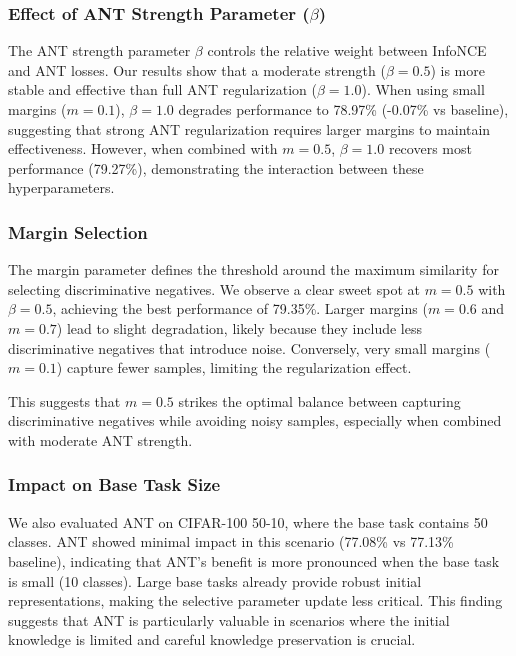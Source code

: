 \documentclass[letterpaper]{article} %
\begin{document}
\subsubsection{Effect of ANT Strength Parameter ($\beta$)}

The ANT strength parameter $\beta$ controls the relative weight between InfoNCE and ANT losses. Our results show that a moderate strength ($\beta=0.5$) is more stable and effective than full ANT regularization ($\beta=1.0$). When using small margins ($m=0.1$), $\beta=1.0$ degrades performance to 78.97\% (-0.07\% vs baseline), suggesting that strong ANT regularization requires larger margins to maintain effectiveness. However, when combined with $m=0.5$, $\beta=1.0$ recovers most performance (79.27\%), demonstrating the interaction between these hyperparameters.

\subsubsection{Margin Selection}

The margin parameter defines the threshold around the maximum similarity for selecting discriminative negatives. We observe a clear sweet spot at $m=0.5$ with $\beta=0.5$, achieving the best performance of 79.35\%. Larger margins ($m=0.6$ and $m=0.7$) lead to slight degradation, likely because they include less discriminative negatives that introduce noise. Conversely, very small margins ($m=0.1$) capture fewer samples, limiting the regularization effect.

This suggests that $m=0.5$ strikes the optimal balance between capturing discriminative negatives while avoiding noisy samples, especially when combined with moderate ANT strength.

\subsubsection{Impact on Base Task Size}

We also evaluated ANT on CIFAR-100 50-10, where the base task contains 50 classes. ANT showed minimal impact in this scenario (77.08\% vs 77.13\% baseline), indicating that ANT's benefit is more pronounced when the base task is small (10 classes). Large base tasks already provide robust initial representations, making the selective parameter update less critical. This finding suggests that ANT is particularly valuable in scenarios where the initial knowledge is limited and careful knowledge preservation is crucial.




% 
\end{document}
